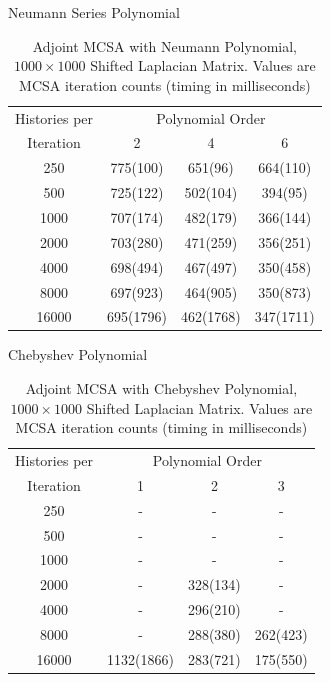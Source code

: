 \documentclass{beamer}
\begin{document}
\begin{frame}{Neumann Series Polynomial}
\begin{table}
\caption{Adjoint MCSA with Neumann Polynomial, $1000 \times 1000$ Shifted Laplacian Matrix.
Values are MCSA iteration counts (timing in milliseconds)
\label{tab:lap_adjoint_neumann}}
\centering
\begin{tabular}{cccc}
\toprule
Histories per & \multicolumn{3}{c}{Polynomial Order} \\
\cmidrule(lr){2-4}
Iteration & 2 & 4 & 6 \\
\midrule
250 &  775(100) & 651(96) & 664(110) \\
500 &  725(122) & 502(104) & 394(95) \\
1000 & 707(174) & 482(179) & 366(144) \\
2000 & 703(280) & 471(259) & 356(251) \\
4000 & 698(494) & 467(497) & 350(458) \\
8000 & 697(923) & 464(905) & 350(873) \\
16000 & 695(1796) & 462(1768) & 347(1711) \\
\bottomrule
\end{tabular}
\end{table}
\end{frame}
\begin{frame}{Chebyshev Polynomial}
\begin{table}
\caption{Adjoint MCSA with Chebyshev Polynomial, $1000 \times 1000$ Shifted Laplacian Matrix.
Values are MCSA iteration counts (timing in milliseconds)
\label{tab:lap_adjoint_cheby}}
\centering
\begin{tabular}{cccc}
\toprule
Histories per & \multicolumn{3}{c}{Polynomial Order} \\
\cmidrule(lr){2-4}
Iteration & 1 & 2 & 3 \\
\midrule
250 & - & - & - \\
500 & - & - & - \\
1000 & - & - & - \\
2000 & - & 328(134) & - \\
4000 & - & 296(210) & - \\
8000 & - & 288(380) & 262(423) \\
16000 & 1132(1866) & 283(721) & 175(550) \\
\bottomrule
\end{tabular}
\end{table}
\end{frame}
\end{document}
